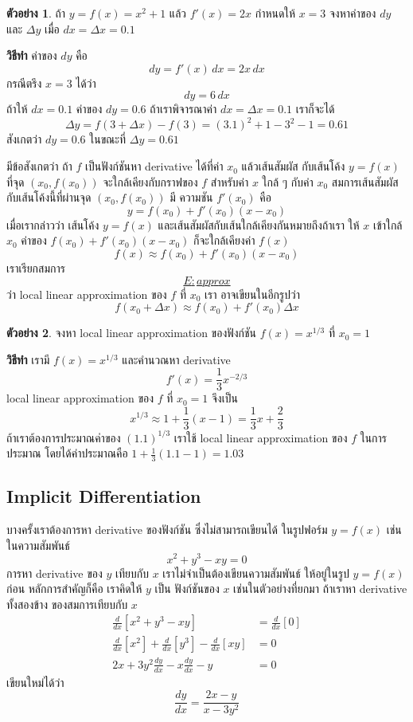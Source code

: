 \documentclass[
]{book}
\theoremstyle{definition}
\theoremstyle{definition}
\newtheorem{example}{ตัวอย่าง}[chapter]
\theoremstyle{definition}
\theoremstyle{definition}
\theoremstyle{remark}
\begin{document}
\begin{example}
ถ้า \(y = f(x) = x^2+1\) แล้ว \(f'(x) = 2x\) กำหนดให้ \(x=3\) จงหาค่าของ \(dy\) และ
\(\Delta y\) เมื่อ \(dx = \Delta x = 0.1\)
\end{example}

\textbf{วิธีทำ} ค่าของ \(dy\) คือ \[dy = f'(x) \,dx = 2x\,dx\] กรณีตรึง \(x=3\) ได้ว่า
\[dy = 6\,dx\] ถ้าให้ \(dx=0.1\) ค่าของ \(dy = 0.6\) ถ้าเราพิจารณาค่า
\(dx = \Delta x= 0.1\) เราก็จะได้
\[\Delta y = f(3+\Delta x) - f(3) = (3.1)^2+1 - 3^2-1 = 0.61\] สังเกตว่า
\(dy = 0.6\) ในขณะที่ \(\Delta y = 0.61\)

มีข้อสังเกตว่า ถ้า \(f\) เป็นฟังก์ชันหา derivative ได้ที่ค่า \(x_0\) แล้วเส้นสัมผัส กับเส้นโค้ง
\(y= f(x)\) ที่จุด \((x_0,f(x_0))\) จะใกล้เคียงกับกราฟของ \(f\) สำหรับค่า \(x\) ใกล้ ๆ
กับค่า \(x_0\) สมการเส้นสัมผัสกับเส้นโค้งนี้ที่ผ่านจุด \((x_0,f(x_0))\) มี ความชัน \(f'(x_0)\)
คือ \[y = f(x_0) + f'(x_0)(x-x_0)\] เมื่อเรากล่าวว่า เส้นโค้ง \(y=f(x)\)
และเส้นสัมผัสกับเส้นใกล้เคียงกันหมายถึงถ้าเรา ให้ \(x\) เข้าใกล้ \(x_0\) ค่าของ
\(f(x_0)+f'(x_0)(x-x_0)\) ก็จะใกล้เคียงค่า \(f(x)\) \[\label{E:approx}
    f(x) \approx  f(x_0) + f'(x_0)(x-x_0)\]
เราเรียกสมการ~\hyperref[E:approx]{\[E:approx\]} ว่า local linear approximation ของ \(f\) ที่ \(x_0\) เรา
อาจเขียนในอีกรูปว่า \[f(x_0 + \Delta x) \approx f(x_0) + f'(x_0)\Delta x\]

\begin{example}
จงหา local linear approximation ของฟังก์ชัน \(f(x) = x^{1/3}\) ที่ \(x_0 = 1\)
\end{example}

\textbf{วิธีทำ} เรามี \(f(x) = x^{1/3}\) และคำนวณหา derivative
\[f'(x) = \frac{1}{3}x^{-2/3}\] local linear approximation ของ \(f\) ที่
\(x_0 = 1\) จึงเป็น
\[x^{1/3} \approx 1 + \frac{1}{3}(x-1) = \frac{1}{3}x+\frac{2}{3}\]
ถ้าเราต้องการประมาณค่าของ \((1.1)^{1/3}\) เราใช้ local linear approximation
ของ \(f\) ในการประมาณ โดยได้ค่าประมาณคือ \(1+\frac{1}{3}(1.1-1) = 1.03\)

\subsection{Implicit Differentiation}\label{implicit-differentiation}

บางครั้งเราต้องการหา derivative ของฟังก์ชัน ซึ่งไม่สามารถเขียนได้ ในรูปฟอร์ม
\(y = f(x)\) เช่นในความสัมพันธ์ \[x^2+y^3 - xy = 0\] การหา derivative ของ \(y\)
เทียบกับ \(x\) เราไม่จำเป็นต้องเขียนความสัมพันธ์ ให้อยู่ในรูป \(y = f(x)\) ก่อน
หลักการสำคัญก็คือ เราคิดให้ \(y\) เป็น ฟังก์ชันของ \(x\) เช่นในตัวอย่างที่ยกมา ถ้าเราหา
derivative ทั้งสองข้าง ของสมการเทียบกับ \(x\) \begin{equation}   \begin{aligned}
    \frac{d}{dx}[x^2+y^3-xy] &= \frac{d}{dx}[0] \\
    \frac{d}{dx}[x^2] + \frac{d}{dx}[y^3] - \frac{d}{dx}[xy] &= 0 \\
    2x + 3y^2 \frac{dy}{dx} - x\frac{dy}{dx} -y &= 0
  \end{aligned} \end{equation} เขียนใหม่ได้ว่า \[\frac{dy}{dx} = \frac{2x-y}{x-3y^2}\]
\end{document}
